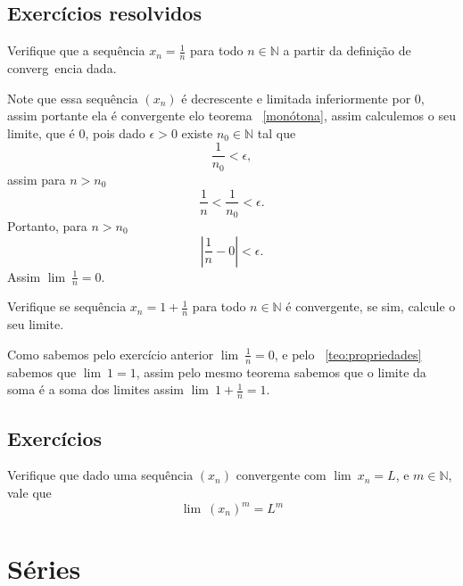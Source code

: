 \subsection*{Exercícios resolvidos}

\construirExeresol

\begin{exeresol}
    Verifique que a sequência $x_n = \frac{1}{n}$ para todo $n \in \mathbb{N}$ a 
    partir da definição de converg~encia dada.
\end{exeresol}

\begin{resol}
    Note que essa sequência $(x_n)$ é decrescente e limitada inferiormente por 0,
    assim portante ela é convergente elo teorema ~\ref{monótona}, assim calculemos
    o seu limite, que é $0$, pois dado $\epsilon > 0$ existe $n_0 \in \mathbb{N}$
    tal que
    $$\frac{1}{n_0}< \epsilon,$$
    assim para $n>n_0$
    $$\frac{1}{n} < \frac{1}{n_0} < \epsilon.$$
    Portanto, para $n>n_0$
    $$|\frac{1}{n} - 0| < \epsilon.$$
    Assim $\lim{\:} \frac{1}{n} = 0$.
\end{resol}

\begin{exeresol}
    Verifique se sequência $x_n = 1 + \frac{1}{n}$ para todo $n \in \mathbb{N}$ 
    é convergente, se sim, calcule o seu limite.
\end{exeresol}
    
\begin{resol}
    Como sabemos pelo exercício anterior $\lim{\:} \frac{1}{n} = 0$, e pelo
    ~\ref{teo:propriedades} sabemos que $\lim{\:} 1 = 1$, assim pelo mesmo teorema
    sabemos que o limite da soma é a soma dos limites assim 
    $\lim{\:} 1 +\frac{1}{n} = 1$.
\end{resol}

\subsection*{Exercícios}

\construirExer

\begin{exer}
    Verifique que dado uma sequência $(x_n)$ convergente com $\lim{\:} x_n = L$,
    e $m \in \mathbb{N}$, vale que
    $$ \lim{\:} (x_n)^m = L^m$$
\end{exer}


\section{Séries}
\construirSec

